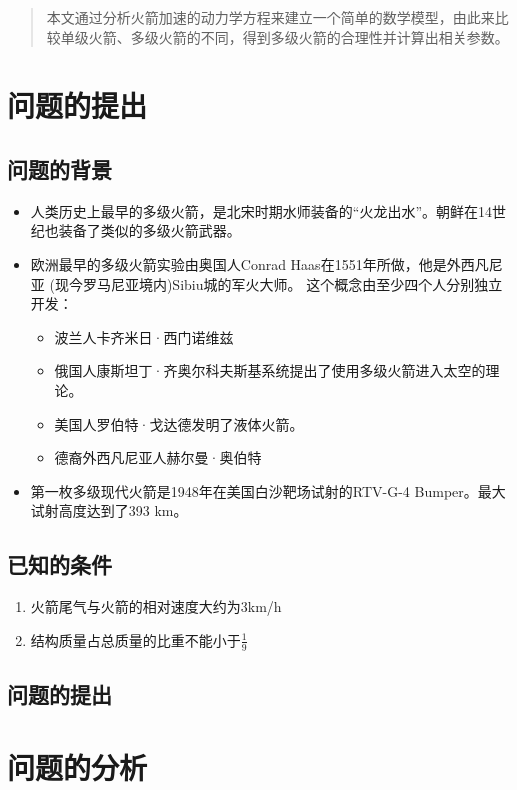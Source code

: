 \documentclass{JXUSTmodeling}
\begin{document}
\begin{abstract}
    本文通过分析火箭加速的动力学方程来建立一个简单的数学模型，由此来比较单级火箭、多级火箭的不同，得到多级火箭的合理性并计算出相关参数。
\end{abstract}
\section{问题的提出}\label{sec:1}
\subsection{问题的背景}\label{sub:1.1}
\begin{itemize}
    \item 人类历史上最早的多级火箭，是北宋时期水师装备的“火龙出水”。朝鲜在14世纪也装备了类似的多级火箭武器。
    \item 欧洲最早的多级火箭实验由奥国人Conrad Haas在1551年所做，他是外西凡尼亚 (现今罗马尼亚境内)Sibiu城的军火大师。 这个概念由至少四个人分别独立开发：
      \begin{itemize}
        \item 波兰人卡齐米日·西门诺维兹
        \item 俄国人康斯坦丁·齐奥尔科夫斯基系统提出了使用多级火箭进入太空的理论。
        \item 美国人罗伯特·戈达德发明了液体火箭。
        \item 德裔外西凡尼亚人赫尔曼·奥伯特
      \end{itemize}
      \item 第一枚多级现代火箭是1948年在美国白沙靶场试射的RTV-G-4 Bumper。最大试射高度达到了393 km。
  \end{itemize}
  
  
  
\subsection{已知的条件}\label{sub:1.2}
\begin{enumerate}
\item 火箭尾气与火箭的相对速度大约为3km/h
\item 结构质量占总质量的比重不能小于$\frac{1}{9}$
\end{enumerate}
\subsection{问题的提出}\label{sub:1.3}

\section{问题的分析}\label{sec:2}
\end{document}
